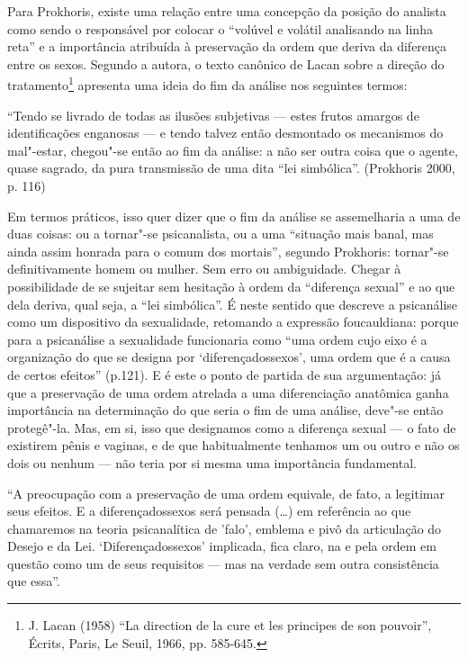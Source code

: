Para Prokhoris, existe uma relação entre uma concepção da posição do
analista como sendo o responsável por colocar o ``volúvel e volátil
analisando na linha reta'' e a importância atribuída à preservação da
ordem que deriva da diferença entre os sexos. Segundo a autora, o texto
canônico de Lacan sobre a direção do tratamento\footnote{J. Lacan
  (1958) ``La direction de la cure et les principes de son pouvoir'',
  Écrits, Paris, Le Seuil, 1966, pp. 585-645.} apresenta uma ideia do fim
da análise nos seguintes termos:

``Tendo se livrado de todas as ilusões subjetivas --- estes frutos
amargos de identificações enganosas --- e tendo talvez então desmontado
os mecanismos do mal"-estar, chegou"-se então ao fim da análise: a não
ser outra coisa que o agente, quase sagrado, da pura transmissão de uma
dita ``lei simbólica''. (Prokhoris 2000, p. 116)

Em termos práticos, isso quer dizer que o fim da análise se assemelharia
a uma de duas coisas: ou a tornar"-se psicanalista, ou a uma ``situação
mais banal, mas ainda assim honrada para o comum dos mortais'', segundo
Prokhoris: tornar"-se definitivamente homem ou mulher. Sem erro ou
ambiguidade. Chegar à possibilidade de se sujeitar sem hesitação à ordem
da ``diferença sexual'' e ao que dela deriva, qual seja, a ``lei
simbólica''. É neste sentido que descreve a psicanálise como um
dispositivo da sexualidade, retomando a expressão foucauldiana: porque
para a psicanálise a sexualidade funcionaria como ``uma ordem cujo eixo
é a organização do que se designa por `diferençadossexos', uma ordem
que é a causa de certos efeitos'' (p.121). E é este o ponto de partida
de sua argumentação: já que a preservação de uma ordem atrelada a uma
diferenciação anatômica ganha importância na determinação do que seria o
fim de uma análise, deve"-se então protegê"-la. Mas, em si, isso que
designamos como a diferença sexual --- o fato de existirem pênis e
vaginas, e de que habitualmente tenhamos um ou outro e não os dois ou
nenhum --- não teria por si mesma uma importância fundamental.

``A preocupação com a preservação de uma ordem equivale, de fato, a
legitimar seus efeitos. E a diferençadossexos será pensada (\ldots{})
em referência ao que chamaremos na teoria psicanalítica de 'falo',
emblema e pivô da articulação do Desejo e da Lei. `Diferençadossexos'
implicada, fica claro, na e pela ordem em questão como um de seus
requisitos --- mas na verdade sem outra consistência que essa''.


